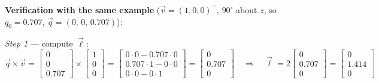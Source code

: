 \documentclass[12pt, a4paper]{article}
\begin{document}
\textbf{Verification with the same example}
($\vec{v} = (1,0,0)^\top$, $90^\circ$ about $z$, so
$q_0 = 0.707$, $\vec{q} = (0,\,0,\,0.707)$):

\textit{Step 1} --- compute $\vec{\ell}$:
\[
  \vec{q} \times \vec{v}
  = \begin{bmatrix}0\\0\\0.707\end{bmatrix}
    \times
    \begin{bmatrix}1\\0\\0\end{bmatrix}
  = \begin{bmatrix}
      0\cdot0 - 0.707\cdot0 \\
      0.707\cdot1 - 0\cdot0 \\
      0\cdot0 - 0\cdot1
    \end{bmatrix}
  = \begin{bmatrix}0\\0.707\\0\end{bmatrix}
  \quad\Longrightarrow\quad
  \vec{\ell} = 2\begin{bmatrix}0\\0.707\\0\end{bmatrix}
             = \begin{bmatrix}0\\1.414\\0\end{bmatrix}
\]
\end{document}
